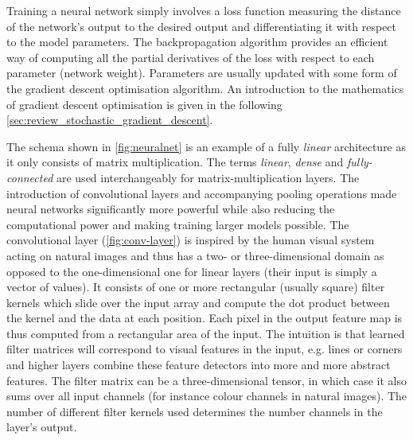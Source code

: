 Training a neural network simply involves a loss function measuring the distance
of the network's output to the desired output and differentiating it with respect
to the model parameters. The backpropagation algorithm provides an efficient way
of computing all the partial derivatives of the loss with respect to each
parameter (network weight). Parameters are usually updated with some form of the
gradient descent optimisation algorithm. An introduction to the mathematics of
gradient descent optimisation is given in the following \cref{sec:review_stochastic_gradient_descent}.

The schema shown in \cref{fig:neuralnet} is an example of a fully \emph{linear}
architecture as it only consists of matrix multiplication. The terms
\emph{linear}, \emph{dense} and \emph{fully-connected} are used interchangeably
for matrix-multiplication layers. The introduction of convolutional layers and
accompanying pooling operations made neural networks significantly more powerful
while also reducing the computational power and making training larger models
possible. The convolutional layer (\cref{fig:conv-layer}) is inspired by the
human visual system acting on natural images and thus has a two- or
three-dimensional domain as opposed to the one-dimensional one for linear layers
(their input is simply a vector of values). It consists of one or more
rectangular (usually square) filter kernels which slide over the input array and
compute the dot product between the kernel and the data at each position. Each
pixel in the output feature map is thus computed from a rectangular area of the
input. The intuition is that learned filter matrices will correspond to visual
features in the input, e.g. lines or corners and higher layers combine these
feature detectors into more and more abstract features. The filter matrix can be
a three-dimensional tensor, in which case it also sums over all input channels
(for instance colour channels in natural images).  The number of different
filter kernels used determines the number channels in the layer's output.

